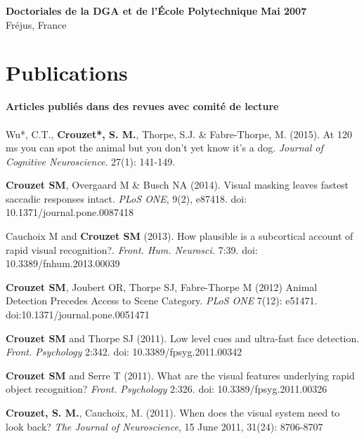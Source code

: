 \documentclass[margin,line]{resume}
\begin{document}
\begin{resume}
	\textbf{Doctoriales de la DGA et de l'École Polytechnique} \hfill \textbf{Mai 2007}\\
	Fréjus, France
	\vspace{-1.5mm}


\vspace{3mm}	
\section{\mysidestyle Publications}

\textbf{Articles publiés dans des revues avec comité de lecture}\\\\
	Wu*, C.T.,  \textbf{Crouzet*, S. M.}, Thorpe, S.J. \& Fabre-Thorpe, M. (2015). At 120 ms you can spot the animal but you don't yet know it's a dog. \textit{Journal of Cognitive Neuroscience}. 27(1): 141-149.

  	\vspace{-2mm} \textbf{Crouzet SM}, Overgaard M \& Busch NA (2014). Visual masking leaves fastest saccadic responses intact. \textit{PLoS ONE}, 9(2), e87418. doi: 10.1371/journal.pone.0087418

\newpage

	\vspace{-2mm} Cauchoix M and \textbf{Crouzet SM} (2013). How plausible is a subcortical account of rapid visual recognition?. \textit{Front. Hum. Neurosci.} 7:39. doi: 10.3389/fnhum.2013.00039
	
	\vspace{-2mm} \textbf{Crouzet SM}, Joubert OR, Thorpe SJ, Fabre-Thorpe M (2012) Animal Detection Precedes Access to Scene Category. \textit{PLoS ONE} 7(12): e51471. doi:10.1371/journal.pone.0051471



	\vspace{-2mm} \textbf{Crouzet SM} and Thorpe SJ (2011). Low level cues and ultra-fast face detection. \textit{Front. Psychology} 2:342. doi: 10.3389/fpsyg.2011.00342

	\vspace{-2mm} \textbf{Crouzet SM} and Serre T (2011). What are the visual features underlying rapid object recognition? \textit{Front. Psychology} 2:326. doi: 10.3389/fpsyg.2011.00326

	\vspace{-2mm} \textbf{Crouzet, S. M.}, Cauchoix, M. (2011). When does the visual system need to look back?  \textit{The Journal of Neuroscience}, 15 June 2011, 31(24): 8706-8707


\end{resume}
\end{document}
